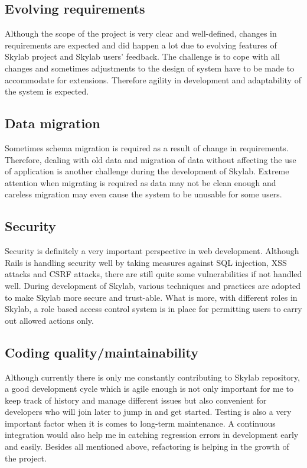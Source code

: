\subsection{Evolving requirements}
Although the scope of the project is very clear and well-defined, changes in requirements are expected and did happen a lot due to evolving features of Skylab project and Skylab users' feedback. The challenge is to cope with all changes and sometimes adjustments to the design of system have to be made to accommodate for extensions. Therefore agility in development and adaptability of the system is expected.

\subsection{Data migration}
Sometimes schema migration is required as a result of change in requirements. Therefore, dealing with old data and migration of data without affecting the use of application is another challenge during the development of Skylab. Extreme attention when migrating is required as data may not be clean enough and careless migration may even cause the system to be unusable for some users.

\subsection{Security}
Security is definitely a very important perspective in web development. Although Rails is handling security well by taking measures against SQL injection, XSS attacks and CSRF attacks, there are still quite some vulnerabilities if not handled well. During development of Skylab, various techniques and practices are adopted to make Skylab more secure and trust-able. What is more, with different roles in Skylab, a role based access control system is in place for permitting users to carry out allowed actions only.

\subsection{Coding quality/maintainability}
Although currently there is only me constantly contributing to Skylab repository, a good development cycle which is agile enough is not only important for me to keep track of history and manage different issues but also convenient for developers who will join later to jump in and get started. Testing is also a very important factor when it is comes to long-term maintenance. A continuous integration would also help me in catching regression errors in development early and easily. Besides all mentioned above, refactoring is helping in the growth of the project.

